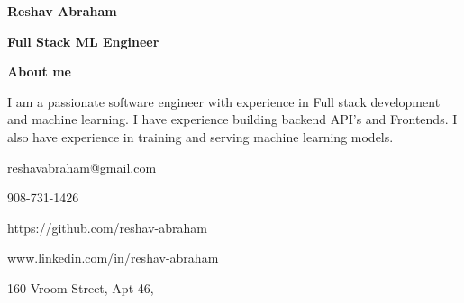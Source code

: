 \documentclass{article}
\begin{document}
\begin{minipage}[t][0pt]{8in\linewidth}
    \begin{minipage}[t]{5.5in\linewidth}
    \Huge\vspace{0in}\hspace{-0.30em}\textbf{Reshav Abraham}  

    \vspace{0em}\hspace{-0.2em}\Large\textbf{Full Stack ML Engineer} 

    \vspace{0.5em}\hspace{0em}\small\textbf{About me} 

        \begin{minipage}[t]{0.6\textwidth\hspace{0em}}
        I am a passionate software engineer with experience in Full stack development
        and machine learning. I have experience building backend API's and Frontends. I also have experience in training and serving machine learning models. \par
        \end{minipage}
    \end{minipage}
    \begin{minipage}[t]{17em\linewidth\hspace{-4em}}
        
        \vspace{2.75em}
        \faEnvelopeO\hspace{0.4em}\small\mdseries\textrm{reshavabraham@gmail.com}

        \vspace{0.2em}
        \faPhone\hspace{0.65em}\small\mdseries\textrm{908-731-1426}
        
        \vspace{0.2em}
        \faGithub\hspace{0.6em}\small\mdseries\textrm{https://github.com/reshav-abraham}
        
        \vspace{0.2em}
        \faLinkedin\hspace{0.6em}\small\mdseries\textrm{www.linkedin.com/in/reshav-abraham}
        
        \vspace{0.2em}
        \faHome\hspace{0.4em}\small\mdseries\textrm{160 Vroom Street, Apt 46,} 
        

\end{minipage}
\end{minipage}
\end{document}
